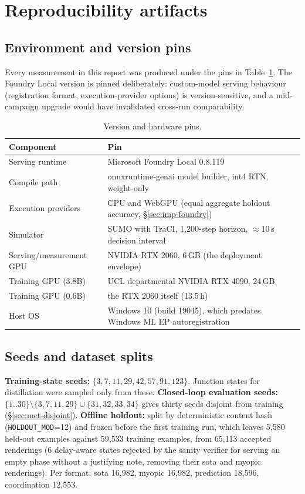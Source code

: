 \section{Reproducibility artifacts}\label{app:repro}

\subsection{Environment and version pins}
Every measurement in this report was produced under the pins in
Table~\ref{tab:pins}. The Foundry Local version is pinned deliberately:
custom-model serving behaviour (registration format, execution-provider
options) is version-sensitive, and a mid-campaign upgrade would have
invalidated cross-run comparability.

\begin{table}[t]

\centering
\small
\begin{tabular}{ll}
\toprule
Component & Pin \\
\midrule
Serving runtime & Microsoft Foundry Local 0.8.119 \\
Compile path & onnxruntime-genai model builder, int4 RTN, weight-only \\
Execution providers & CPU and WebGPU (equal aggregate holdout accuracy, \S\ref{sec:imp-foundry}) \\
Simulator & SUMO with TraCI, 1{,}200-step horizon, $\approx$10\,s decision interval \\
Serving/measurement GPU & NVIDIA RTX 2060, 6\,GB (the deployment envelope) \\
Training GPU (3.8B) & UCL departmental NVIDIA RTX 4090, 24\,GB \\
Training GPU (0.6B) & the RTX 2060 itself (13.5\,h) \\
Host OS & Windows 10 (build 19045), which predates Windows ML EP autoregistration \\
\bottomrule
\end{tabular}
\caption{Version and hardware pins.}
\label{tab:pins}
\end{table}

\subsection{Seeds and dataset splits}
\textbf{Training-state seeds:} $\{3, 7, 11, 29, 42, 57, 91, 123\}$. Junction states for
distillation were sampled only from these.
\textbf{Closed-loop evaluation seeds:}
$\{1..30\}\setminus\{3,7,11,29\}\cup\{31,32,33,34\}$ gives thirty seeds
disjoint from training (\S\ref{sec:met-disjoint}).
\textbf{Offline holdout:} split by deterministic content hash
(\texttt{HOLDOUT\_MOD}=12) and frozen before the first training run, which
leaves 5{,}580 held-out examples against 59{,}533 training examples, from
65{,}113 accepted renderings (6 delay-aware states rejected by the sanity
verifier for serving an empty phase without a justifying note, removing
their sota and myopic renderings). Per format: sota 16{,}982, myopic
16{,}982, prediction 18{,}596, coordination 12{,}553.

